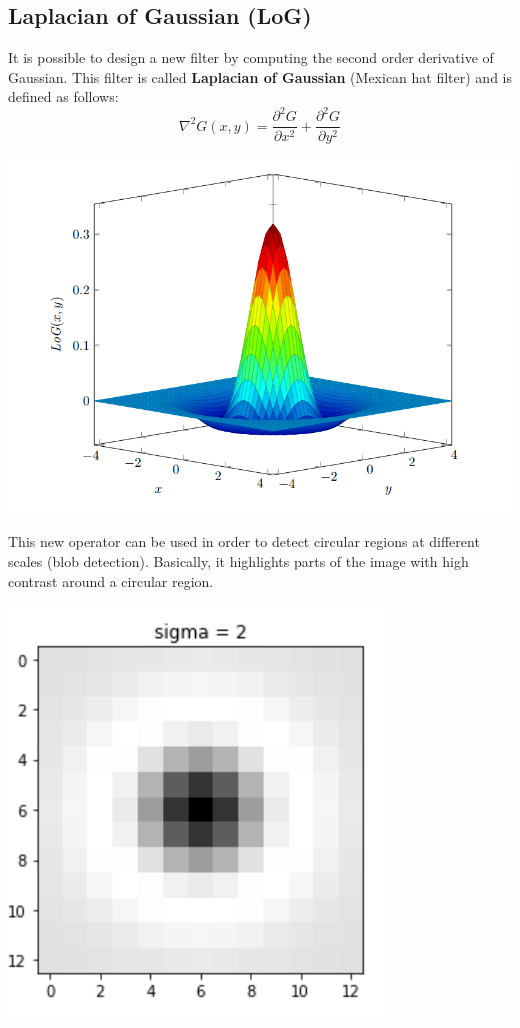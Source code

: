 \subsection{Laplacian of Gaussian (LoG)}
It is possible to design a new filter by computing the second order derivative of Gaussian. This filter is called \textbf{Laplacian of Gaussian} (Mexican hat filter) and is defined as follows:
\[\nabla^{2}G(x,y) = \frac{\partial^{2}G}{\partial x^{2}} + \frac{\partial^{2}G}{\partial y^{2}}\]
\begin{center}
    \includegraphics[]{images/LoG.png}
\end{center}
This new operator can be used in order to detect circular regions at different scales (blob detection). Basically, it highlights parts of the image with high contrast around a circular region.
\begin{center}
    \includegraphics[scale = 0.8]{images/circular region loG.png}
\end{center}
